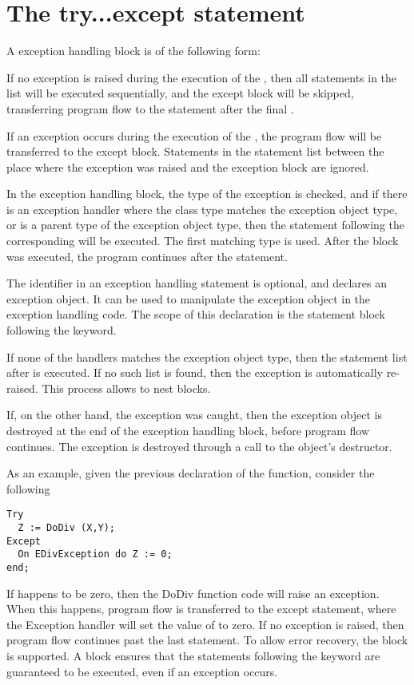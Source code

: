 \section{The try...except statement}
   
A  exception handling block is of the following form:

If no exception is raised during the execution of the ,
then all statements in the list will be executed sequentially, and the
except block will be skipped, transferring program flow to the statement
after the final .

If an exception occurs during the execution of the , the
program flow will be transferred to the except block. Statements in the
statement list between the place where the exception was raised and the
exception block are ignored.

In the exception handling block, the type of the exception is checked,
and if there is an exception handler where the class type matches the
exception object type, or is a parent type of
the exception object type, then the statement following the corresponding
 will be executed. The first matching type is used. After the
 block was executed, the program continues after the 
statement.

The identifier in an exception handling statement is optional, and declares
an exception object. It can be used to manipulate the exception object in
the exception handling code. The scope of this declaration is the statement
block following the  keyword.

If none of the  handlers matches the exception object type, then the
statement list after  is executed. If no such list is
found, then the exception is automatically re-raised. This process allows
to nest  blocks.

If, on the other hand, the exception was caught, then the exception object is
destroyed at the end of the exception handling block, before program flow
continues. The exception is destroyed through a call to the object's
 destructor.

As an example, given the previous declaration of the  function,
consider the following
\begin{verbatim}
Try
  Z := DoDiv (X,Y);
Except
  On EDivException do Z := 0;
end;
\end{verbatim}
If  happens to be zero, then the DoDiv function code will raise an
exception. When this happens, program flow is transferred to the except
statement, where the Exception handler will set the value of  to
zero. If no exception is raised, then program flow continues past the last
 statement.
To allow error recovery, the  block is supported.
A  block ensures that the statements following the
 keyword are guaranteed to be executed, even if an exception
occurs.


